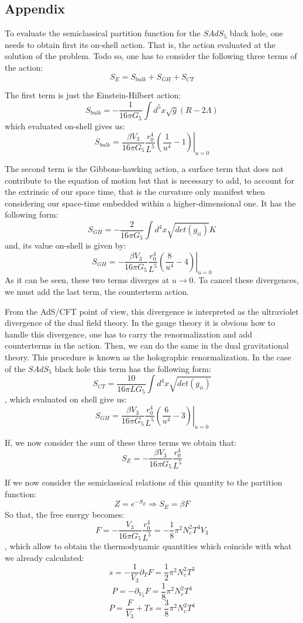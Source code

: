 \documentclass[12pt]{article}
\begin{document}
\subsection{Appendix}

To evaluate the semiclassical partition function for the $SAdS_5$ black hole, one needs to obtain first its on-shell action. That is, the action evaluated at the solution of the problem. Todo so, one has to consider the following three terms of the action:
\[
    S_E = S_{bulk} + S_{GH} + S_{CT}
\]

The first term is just the Einstein-Hilbert action:
\[
    S_{bulk} = -\frac{1}{16\pi G_5}\int d^5 x \sqrt{g}(R-2\Lambda)
\]
which evaluated on-shell gives us:
\[
    S_{bulk} = \frac{\beta V_3}{16\pi G_5}\frac{r_0^4}{L^5}\left.\left(\frac{1}{u^4}-1\right)\right|_{u=0}
\]

The second term is the Gibbons-hawking action, a surface term that does not contribute to the equation of motion but that is necessary to add, to account for the extrinsic of our space time, that is the curvature only manifest when considering our space-time embedded within a higher-dimensional one. It has the following form:
\[
    S_{GH} = -\frac{2}{16\pi G_5}\int d^4 x\sqrt{det(g_{ii})}K
\]
and, its value on-shell is given by:
\[
    S_{GH} = -\frac{\beta V_3}{16\pi G_5}\frac{r_0^4}{L^5}\left.\left(\frac{8}{u^4}-4\right)\right|_{u=0}
\]
As it can be seen, these two terms diverges at $u\rightarrow 0$. To cancel these divergences, we must add the last term, the counterterm action. 

\vspace{.25cm}

From the AdS/CFT point of view, this divergence is interpreted as the ultraviolet divergence of the dual field theory. In the gauge theory it is obvious how to handle this divergence, one has to carry the renormalization and add counterterms in the action. Then, we can do the same in the dual gravitational theory. This procedure is known as the holographic renormalization. In the case of the $SAdS_5$ black hole this term has the following form:
\[
    S_{CT} = \frac{10}{16\pi LG_5}\int d^4 x\sqrt{det(g_{ii})}
\]
, which evaluated on shell give us:
\[
    S_{GH} = \frac{\beta V_3}{16\pi G_5}\frac{r_0^4}{L^5}\left.\left(\frac{6}{u^4}-3\right)\right|_{u=0}
\]

If, we now consider the sum of these three terms we obtain that:
\[
    S_E = -\frac{\beta V_3}{16\pi G_5}\frac{r_0^4}{L^5}
\]

If we now consider the semiclassical relations of this quantity to the partition function:
\[
    Z = e^{-S_E} \Longrightarrow S_E=\beta F
\]
So that, the free energy becomes:
\[
    F = -\frac{V_3}{16\pi G_5}\frac{r_0^4}{L^5} = -\frac{1}{8}\pi^2N_c^2 T^4V_3
\]
, which allow to obtain the thermodynamic quantities which coincide with what we already calculated:
\[
    s= -\frac{1}{V_3}\partial_T F = \frac{1}{2}\pi^2 N_c^2 T^3
\]
\[
    P = -\partial_{V_3} F = \frac{1}{8}\pi^2 N_c^2 T^4
\]
\[
    P = \frac{F}{V_3} +Ts = \frac{3}{8}\pi^2 N_c^2 T^4
\]
\end{document}
